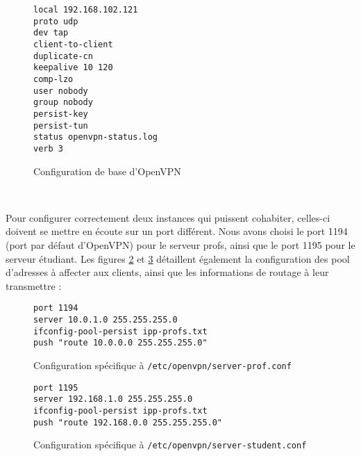 \begin{figure}[H]
	\begin{center}
		\begin{minipage}{0.90\textwidth}
			\begin{lstlisting}[frame=trBL]
local 192.168.102.121
proto udp
dev tap
client-to-client
duplicate-cn
keepalive 10 120
comp-lzo
user nobody
group nobody
persist-key
persist-tun
status openvpn-status.log
verb 3
			\end{lstlisting}
		\end{minipage}
	\end{center}
	\caption{Configuration de base d'OpenVPN}
	\label{configuration_base_openvpn}
\end{figure}

~

Pour configurer correctement deux instances qui puissent cohabiter, celles-ci doivent se mettre en écoute sur un port différent. Nous avons choisi le port 1194 (port par défaut d'OpenVPN) pour le serveur profs, ainsi que le port 1195 pour le serveur étudiant. Les figures \ref{configuration_base_prof} et \ref{configuration_base_student} détaillent également la configuration des pool d'adresses à affecter aux clients, ainsi que les informations de routage à leur transmettre :

\begin{figure}[H]
	\begin{lstlisting}[frame=trBL]
port 1194
server 10.0.1.0 255.255.255.0
ifconfig-pool-persist ipp-profs.txt
push "route 10.0.0.0 255.255.255.0"
	\end{lstlisting}
	\caption{Configuration spécifique à \texttt{/etc/openvpn/server-prof.conf}}
	\label{configuration_base_prof}
\end{figure}
\begin{figure}[H]
	\begin{lstlisting}[frame=trBL]
port 1195
server 192.168.1.0 255.255.255.0
ifconfig-pool-persist ipp-profs.txt
push "route 192.168.0.0 255.255.255.0"
	\end{lstlisting}
	\caption{Configuration spécifique à \texttt{/etc/openvpn/server-student.conf}}
	\label{configuration_base_student}
\end{figure}




